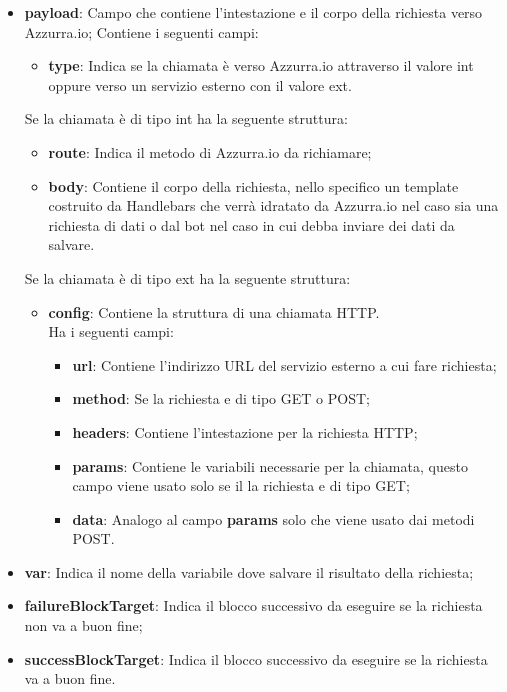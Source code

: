 \begin{itemize}
	\item \textbf{payload}: Campo che contiene l'intestazione e il corpo della richiesta verso Azzurra.io;
	Contiene i seguenti campi:
	\begin{itemize}
		\item \textbf{type}: Indica se la chiamata è verso Azzurra.io attraverso il valore \textsf{int} oppure verso un servizio esterno con il valore \textsf{ext}.
	\end{itemize}
	Se la chiamata è di tipo \textsf{int} ha la seguente struttura:
	\begin{itemize}
		\item \textbf{route}: Indica il metodo di Azzurra.io da richiamare;
		\item \textbf{body}: Contiene il corpo della richiesta, nello specifico un template costruito da \textsf{Handlebars} che verrà idratato da Azzurra.io nel caso sia una richiesta di dati o dal bot nel caso in cui debba inviare dei dati da salvare.
	\end{itemize}
	Se la chiamata è di tipo \textsf{ext} ha la seguente struttura:
	\begin{itemize}
		\item \textbf{config}: Contiene la struttura di una chiamata HTTP.\\
		Ha i seguenti campi:
		\begin{itemize}
			\item \textbf{url}: Contiene l'indirizzo URL del servizio esterno a cui fare richiesta;
			\item \textbf{method}: Se la richiesta e di tipo \textsf{GET} o \textsf{POST};
			\item \textbf{headers}: Contiene l'intestazione per la richiesta HTTP;
			\item \textbf{params}: Contiene le variabili necessarie per la chiamata, questo campo viene usato solo se il la richiesta e di tipo \textsf{GET};
			\item \textbf{data}: Analogo al campo \textbf{params} solo che viene usato dai metodi POST.
		\end{itemize}
	\end{itemize}
	\item \textbf{var}: Indica il nome della variabile dove salvare il risultato della richiesta;
	\item \textbf{failureBlockTarget}: Indica il blocco successivo da eseguire se la richiesta non va a buon fine;
	\item \textbf{successBlockTarget}: Indica il blocco successivo da eseguire se la richiesta va a buon fine.
\end{itemize}

